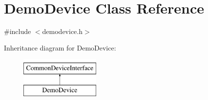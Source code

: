\hypertarget{class_demo_device}{}\section{Demo\+Device Class Reference}
\label{class_demo_device}


{\ttfamily \#include $<$demodevice.\+h$>$}

Inheritance diagram for Demo\+Device\+:\begin{figure}[H]
\begin{center}
\leavevmode
\includegraphics[height=2.000000cm]{class_demo_device}
\end{center}
\end{figure}
